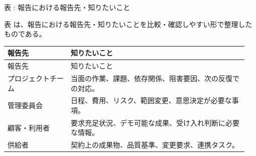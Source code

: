 \par\smallskip\noindent{}\label{tab:ch09-05}表 \thetable: 報告における報告先・知りたいこと\par\smallskip
表 \thetable は、報告における報告先・知りたいことを比較・確認しやすい形で整理したものである。\par\smallskip
\begin{longtable}{>{\raggedright\arraybackslash}p{0.25\linewidth}>{\raggedright\arraybackslash}p{0.70\linewidth}}
\toprule
報告先 & 知りたいこと \\
\midrule
\endfirsthead
\toprule
報告先 & 知りたいこと \\
\midrule
\endhead
プロジェクトチーム & 当面の作業、課題、依存関係、阻害要因、次の反復での対応。 \\
管理委員会 & 日程、費用、リスク、範囲変更、意思決定が必要な事項。 \\
顧客・利用者 & 要求充足状況、デモ可能な成果、受け入れ判断に必要な情報。 \\
供給者 & 契約上の成果物、品質基準、変更要求、連携タスク。 \\
\bottomrule
\end{longtable}
